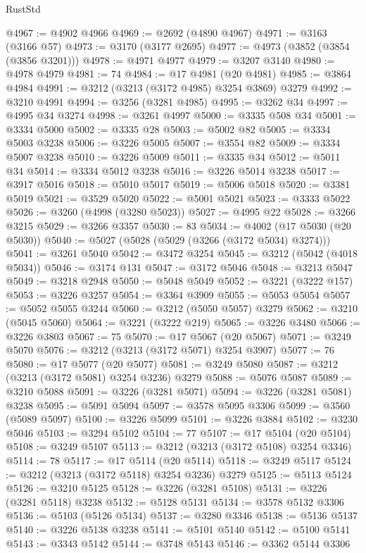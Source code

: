 \begin{lexlean}{RustStd}
\begin{coremodule}
{\begin{coremodule}
{{{{{{{{{{{{{{{{{{{{{{{{{{@4967 := @4902 @4966
@4969 := @2692 (@4890 @4967)
@4971 := @3163 (@3166 @57)
@4973 := @3170 (@3177 @2695)
@4977 := @4973 (@3852 (@3854 (@3856 @3201)))
@4978 := @4971 @4977
@4979 := @3207 @3140
@4980 := @4978 @4979
@4981 := 74
@4984 := @17 @4981 (@20 @4981)
@4985 := @3864 @4984
@4991 := @3212 (@3213 (@3172 @4985) @3254 @3869) @3279
@4992 := @3210 @4991
@4994 := @3256 (@3281 @4985)
@4995 := @3262 @34
@4997 := @4995 @34 @3274
@4998 := @3261 @4997
@5000 := @3335 @508 @34
@5001 := @3334 @5000
@5002 := @3335 @28
@5003 := @5002 @82
@5005 := @3334 @5003 @3238
@5006 := @3226 @5005
@5007 := @3554 @82
@5009 := @3334 @5007 @3238
@5010 := @3226 @5009
@5011 := @3335 @34
@5012 := @5011 @34
@5014 := @3334 @5012 @3238
@5016 := @3226 @5014 @3238
@5017 := @3917 @5016
@5018 := @5010 @5017
@5019 := @5006 @5018
@5020 := @3381 @5019
@5021 := @3529 @5020
@5022 := @5001 @5021
@5023 := @3333 @5022
@5026 := @3260 (@4998 (@3280 @5023))
@5027 := @4995 @22
@5028 := @3266 @3215
@5029 := @3266 @3357
@5030 := 83
@5034 := @4002 (@17 @5030 (@20 @5030))
@5040 := @5027 (@5028 (@5029 (@3266 (@3172 @5034) @3274)))
@5041 := @3261 @5040
@5042 := @3472 @3254
@5045 := @3212 (@5042 (@4018 @5034))
@5046 := @3174 @131
@5047 := @3172 @5046
@5048 := @3213 @5047
@5049 := @3218 @2948
@5050 := @5048 @5049
@5052 := @3221 (@3222 @157)
@5053 := @3226 @3257
@5054 := @3364 @3909
@5055 := @5053 @5054
@5057 := @5052 @5055 @3244
@5060 := @3212 (@5050 @5057) @3279
@5062 := @3210 (@5045 @5060)
@5064 := @3221 (@3222 @219)
@5065 := @3226 @3480
@5066 := @3226 @3803
@5067 := 75
@5070 := @17 @5067 (@20 @5067)
@5071 := @3249 @5070
@5076 := @3212 (@3213 (@3172 @5071) @3254 @3907)
@5077 := 76
@5080 := @17 @5077 (@20 @5077)
@5081 := @3249 @5080
@5087 := @3212 (@3213 (@3172 @5081) @3254 @3236) @3279
@5088 := @5076 @5087
@5089 := @3210 @5088
@5091 := @3226 (@3281 @5071)
@5094 := @3226 (@3281 @5081) @3238
@5095 := @5091 @5094
@5097 := @3578 @5095 @3306
@5099 := @3560 (@5089 @5097)
@5100 := @3226 @5099
@5101 := @3226 @3884
@5102 := @3230 @5046
@5103 := @3294 @5102
@5104 := 77
@5107 := @17 @5104 (@20 @5104)
@5108 := @3249 @5107
@5113 := @3212 (@3213 (@3172 @5108) @3254 @3346)
@5114 := 78
@5117 := @17 @5114 (@20 @5114)
@5118 := @3249 @5117
@5124 := @3212 (@3213 (@3172 @5118) @3254 @3236) @3279
@5125 := @5113 @5124
@5126 := @3210 @5125
@5128 := @3226 (@3281 @5108)
@5131 := @3226 (@3281 @5118) @3238
@5132 := @5128 @5131
@5134 := @3578 @5132 @3306
@5136 := @5103 (@5126 @5134)
@5137 := @3280 @3346
@5138 := @5136 @5137
@5140 := @3226 @5138 @3238
@5141 := @5101 @5140
@5142 := @5100 @5141
@5143 := @3343 @5142
@5144 := @3748 @5143
@5146 := @3362 @5144 @3306
}}}}}}}}}}}}}}}}}}}}}}}}}}
\end{coremodule}}
\end{coremodule}
\end{lexlean}

